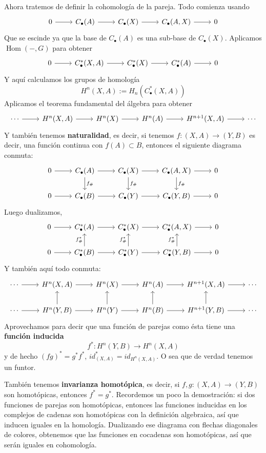\documentclass[spanish]{book}
\theoremstyle{definition}
\DeclareMathOperator{\Hom}{Hom}
\begin{document}
Ahora tratemos de definir la cohomología de la pareja. Todo comienza usando
\[\begin{tikzcd}
	0\arrow[r]&C_\bullet(A)\arrow[r]&C_\bullet(X)\arrow[r]&C_\bullet(A,X)\arrow[r]&0
\end{tikzcd}\]
Que se escinde ya que la base de $C_\bullet(A)$ es una sub-base de $C_\bullet(X)$. Aplicamos $\Hom(-,G)$ para obtener
\[\begin{tikzcd}
	0\arrow[r]&C_\bullet^*(X,A)\arrow[r]&C_\bullet^*(X)\arrow[r]&C_\bullet^*(A)\arrow[r]&0
\end{tikzcd}\]
Y aquí calculamos los grupos de homología
\[H^n(X,A):=H_n(C_\bullet^*(X,A))\]
Aplicamos el teorema fundamental del álgebra para obtener
\[\begin{tikzcd}
	\cdots\arrow[r]&H^n(X,A)\arrow[r]&H^n(X)\arrow[r]&H^n(A)\arrow[r]&H^{n+1}(X,A)\arrow[r]&\cdots
\end{tikzcd}\]
Y también tenemos \textbf{naturalidad}, es decir, si tenemos $f:(X,A)\to(Y,B)$ es decir, una función continua con $f(A)\subset B$, entonces el siguiente diagrama conmuta:
\[\begin{tikzcd}
	0\arrow[r]&C_\bullet(A)\arrow[r]\arrow[d,"f_\#"]&C_\bullet(X)\arrow[r]\arrow[d,"f_\#"]&C_\bullet(A,X)\arrow[r]\arrow[d,"f_\#"]&0\\
	0\arrow[r]&C_\bullet(B)\arrow[r]&C_\bullet(Y)\arrow[r]&C_\bullet(Y,B)\arrow[r]&0
\end{tikzcd}\]
Luego dualizamos,
\[\begin{tikzcd}
	0\arrow[r]&C^*_\bullet(A)\arrow[r]&C^*_\bullet(X)\arrow[r]&C^*_\bullet(A,X)\arrow[r]&0\\
	0\arrow[r]&C^*_\bullet(B)\arrow[r]\arrow[u,"f^*_\#"]&C^*_\bullet(Y)\arrow[r]\arrow[u,"f^*_\#"]&C^*_\bullet(Y,B)\arrow[r]\arrow[u,"f^*_\#"]&0
\end{tikzcd}\]
Y también aquí todo conmuta:
\[\begin{tikzcd}
	\cdots\arrow[r]&H^n(X,A)\arrow[r]&H^n(X)\arrow[r]&H^n(A)\arrow[r]&H^{n+1}(X,A)\arrow[r]&\cdots\\
	\cdots\arrow[r]&H^n(Y,B)\arrow[r]\arrow[u]&H^n(Y)\arrow[r]\arrow[u]&H^n(B)\arrow[r]\arrow[u]&H^{n+1}(Y,B)\arrow[r]\arrow[u]&\cdots
\end{tikzcd}\]
Aprovechamos para decir que una función de parejas como ésta tiene una \textbf{función inducida}
\[f^*:H^n(Y,B)\to H^n(X,A)\]
y de hecho $(fg)^*=g^*f^*$, $id^*_{(X,A)}=id_{H^n(X,A)}$. O sea que de verdad tenemos un funtor.

También tenemos \textbf{invarianza homotópica}, es decir, si $f,g:(X,A)\to(Y,B)$ son homotópicas, entonces $f^*=g^*$. Recordemos un poco la demostración: si dos funciones de parejas son homotópicas, entonces las funciones inducidas en los complejos de cadenas son homotópicas con la definición algebraica, así que inducen iguales en la homología. Dualizando ese diagrama con flechas diagonales de colores, obtenemos que las funciones en cocadenas son homotópicas, así que serán iguales en cohomología.
\end{document}
